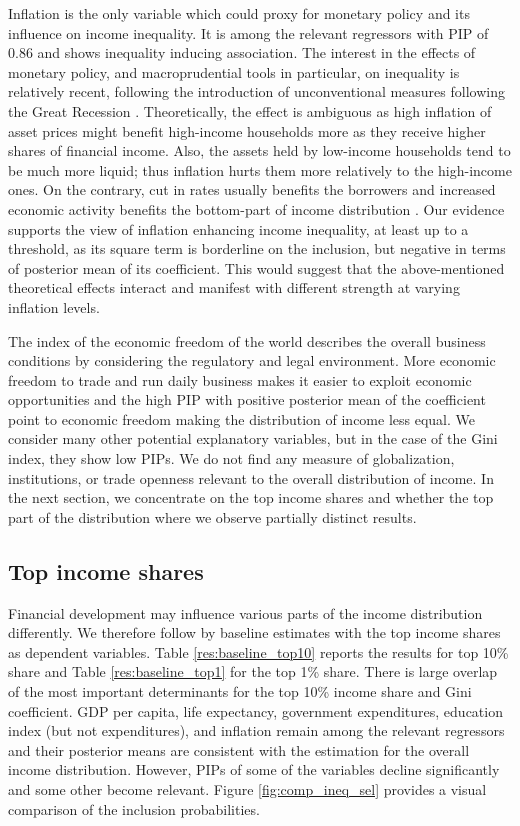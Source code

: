 \documentclass[preprint, nonatbib, 10pt]{elsarticle}
\begin{document}
  Inflation is the only variable which could proxy for monetary policy and its influence on income inequality. It is among the relevant regressors with \ac{PIP} of 0.86 and shows inequality inducing association. The interest in the effects of monetary policy, and macroprudential tools in particular, on inequality is relatively recent, following the introduction of unconventional measures following the Great Recession \parencite{frost2018macroprudential}. Theoretically, the effect is ambiguous as high inflation of asset prices might benefit high-income households more as they receive higher shares of financial income. Also, the assets held by low-income households tend to be much more liquid; thus inflation hurts them more relatively to the high-income ones. On the contrary, cut in rates usually benefits the borrowers and increased economic activity benefits the bottom-part of income distribution \parencite{furceri2019robust}. Our evidence supports the view of inflation enhancing income inequality, at least up to a threshold, as its square term is borderline on the inclusion, but negative in terms of posterior mean of its coefficient. This would suggest that the above-mentioned theoretical effects interact and manifest with different strength at varying inflation levels.
  
  The index of the economic freedom of the world describes the overall business conditions by considering the regulatory and legal environment. More economic freedom to trade and run daily business makes it easier to exploit economic opportunities and the high \ac{PIP} with positive posterior mean of the coefficient point to economic freedom making the distribution of income less equal. We consider many other potential explanatory variables, but in the case of the Gini index, they show low \acp{PIP}. We do not find any measure of globalization, institutions, or trade openness relevant to the overall distribution of income. In the next section, we concentrate on the top income shares and whether the top part of the distribution where we observe partially distinct results.
  
  \subsection{Top income shares}
  Financial development may influence various parts of the income distribution differently. We therefore follow by baseline estimates with the top income shares as dependent variables. Table \ref{res:baseline_top10} reports the results for top 10\% share and Table \ref{res:baseline_top1} for the top 1\% share. There is large overlap of the most important determinants for the top 10\% income share and Gini coefficient. GDP per capita, life expectancy, government expenditures, education index (but not expenditures), and inflation remain among the relevant regressors and their posterior means are consistent with the estimation for the overall income distribution. However, \acp{PIP} of some of the variables decline significantly and some other become relevant. Figure \ref{fig:comp_ineq_sel} provides a visual comparison of the inclusion probabilities.
\end{document}
